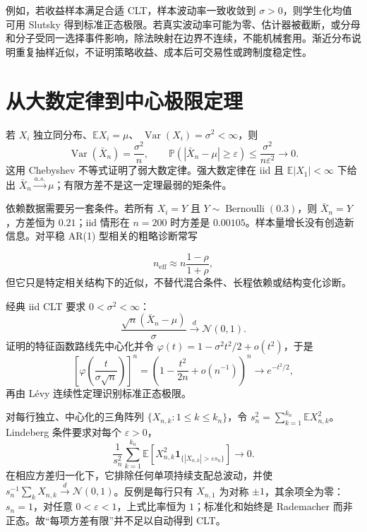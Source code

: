 例如，若收益样本满足合适 CLT，样本波动率一致收敛到 $\sigma>0$，则学生化均值可用 Slutsky 得到标准正态极限。若真实波动率可能为零、估计器被截断，或分母和分子受同一选择事件影响，除法映射在边界不连续，不能机械套用。渐近分布说明重复抽样近似，不证明策略收益、成本后可交易性或跨制度稳定性。

\section{从大数定律到中心极限定理}

若 $X_i$ 独立同分布、$\mathbb E X_i=\mu$、
$\operatorname{Var}(X_i)=\sigma^2<\infty$，则
\[
 \operatorname{Var}(\bar X_n)=\frac{\sigma^2}{n},
 \qquad
 \mathbb P(|\bar X_n-\mu|\ge\varepsilon)
 \le\frac{\sigma^2}{n\varepsilon^2}\to0.
\]
这用 Chebyshev 不等式证明了弱大数定律。强大数定律在 iid 且
$\mathbb E|X_1|<\infty$ 下给出
$\bar X_n\xrightarrow{a.s.}\mu$；有限方差不是这一定理最弱的矩条件。

依赖数据需要另一套条件。若所有 $X_i=Y$ 且
$Y\sim\operatorname{Bernoulli}(0.3)$，则
$\bar X_n=Y$，方差恒为 $0.21$；iid 情形在 $n=200$ 时方差是 $0.00105$。样本量增长没有创造新信息。对平稳 AR(1) 型相关的粗略诊断常写
\begin{diagnostic}
\[
 n_{\mathrm{eff}}\approx n\frac{1-\rho}{1+\rho},
\]
但它只是特定相关结构下的近似，不替代混合条件、长程依赖或结构变化诊断。
\end{diagnostic}


经典 iid CLT 要求 $0<\sigma^2<\infty$：
\[
 \frac{\sqrt n(\bar X_n-\mu)}{\sigma}\xrightarrow d\mathcal N(0,1).
\]
证明的特征函数路线先中心化并令
$\varphi(t)=1-\sigma^2t^2/2+o(t^2)$，于是
\[
 \left[\varphi\!\left(\frac{t}{\sigma\sqrt n}\right)\right]^n
 =\left(1-\frac{t^2}{2n}+o(n^{-1})\right)^n
 \longrightarrow e^{-t^2/2},
\]
再由 Lévy 连续性定理识别标准正态极限。

对每行独立、中心化的三角阵列
$\{X_{n,k}:1\le k\le k_n\}$，令
$s_n^2=\sum_{k=1}^{k_n}\mathbb E X_{n,k}^2$。Lindeberg 条件要求对每个 $\varepsilon>0$，
\[
 \frac1{s_n^2}\sum_{k=1}^{k_n}
 \mathbb E\!\left[
 X_{n,k}^2\mathbf1_{\{|X_{n,k}|>\varepsilon s_n\}}
 \right]\longrightarrow0.
\]
在相应方差归一化下，它排除任何单项持续支配总波动，并使
$s_n^{-1}\sum_kX_{n,k}\xrightarrow d\mathcal N(0,1)$。反例是每行只有
$X_{n,1}$ 为对称 $\pm1$，其余项全为零：$s_n=1$，对任意
$0<\varepsilon<1$，上式比率恒为 $1$；标准化和始终是 Rademacher 而非正态。故“每项方差有限”并不足以自动得到 CLT。

